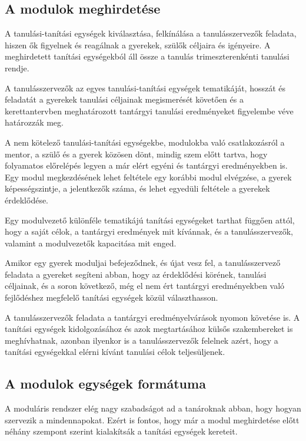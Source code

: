 \subsection{A modulok meghirdetése}
\label{sec:tanítási egységek_meghirdetese}
A tanulási-tanítási egységek kiválasztása, felkínálása a tanulásszervezők feladata, hiszen ők figyelnek és reagálnak a gyerekek, szülők céljaira és igényeire. A meghirdetett tanítási egységekból áll össze a tanulás trimeszterenkénti tanulási rendje.

A tanulásszervezők az egyes tanulási-tanítási egységek tematikáját, hosszát és feladatát a gyerekek tanulási céljainak megismerését követően és a kerettantervben meghatározott tantárgyi tanulási eredményeket figyelembe véve határozzák meg.

A nem kötelező tanulási-tanítási egységekbe, modulokba való csatlakozásról a mentor, a szülő és a gyerek közösen dönt, mindig szem előtt tartva, hogy folyamatos előrelépés legyen a már elért egyéni és tantárgyi eredményekben is. Egy modul megkezdésének lehet feltétele egy korábbi modul elvégzése, a gyerek képességszintje, a jelentkezők száma, és lehet egyedüli feltétele a gyerekek érdeklődése.

Egy modulvezető különféle tematikájú tanítási egységeket tarthat függően attól, hogy a saját célok, a tantárgyi eredmények mit kívánnak, és a tanulásszervezők, valamint a modulvezetők kapacitása mit enged.

Amikor egy gyerek moduljai befejeződnek, és újat vesz fel, a tanulásszervező feladata a gyereket segíteni abban, hogy az érdeklődési körének, tanulási céljainak, és a soron következő, még el nem ért tantárgyi eredményekben való fejlődéshez megfelelő tanítási egységek közül választhasson.

A tanulásszervezők feladata a tantárgyi eredményelvárások nyomon követése is. A tanítási egységek kidolgozásához és azok megtartásához külsős szakembereket is meghívhatnak, azonban ilyenkor is a tanulásszervezők felelnek azért, hogy a tanítási egységekkal elérni kívánt tanulási célok teljesüljenek.

\subsection{A modulok egységek formátuma}

A moduláris rendszer elég nagy szabadságot ad a tanároknak abban, hogy hogyan szervezik a mindennapokat. Ezért is fontos, hogy már a modul meghirdetése előtt néhány szempont szerint kialakítsák a tanítási egységek kereteit.

